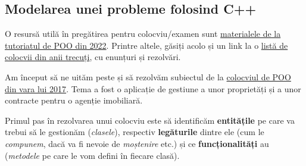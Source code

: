 \subsection*{Modelarea unei probleme folosind C++}

O resursă utilă în pregătirea pentru colocviu/examen sunt \href{https://github.com/DimaOanaTeodora/Tutoriat-POO-2022}{materialele de la tutoriatul de POO din 2022}. Printre altele, găsiți acolo și un link la o \href{https://github.com/dariabroscoteanu/OOP/tree/main/Lab\%20Exams}{listă de colocvii din anii trecuți}, cu enunțuri și rezolvări.

Am început să ne uităm peste și să rezolvăm subiectul de la \href{https://github.com/dariabroscoteanu/OOP/blob/main/Lab\%20Exams/Colocviu2017\%20-\%2015\%2621/POO\%20colocviu\%20vara\%202017.jpg}{colocviul de POO din vara lui 2017}. Tema a fost o aplicație de gestiune a unor proprietăți și a unor contracte pentru o agenție imobiliară.

Primul pas în rezolvarea unui colocviu este să identificăm \textbf{entitățile} pe care va trebui să le gestionăm (\emph{clasele}), respectiv \textbf{legăturile} dintre ele (cum le \emph{compunem}, dacă va fi nevoie de \emph{moștenire} etc.) și ce \textbf{funcționalități} au (\emph{metodele} pe care le vom defini în fiecare clasă).

